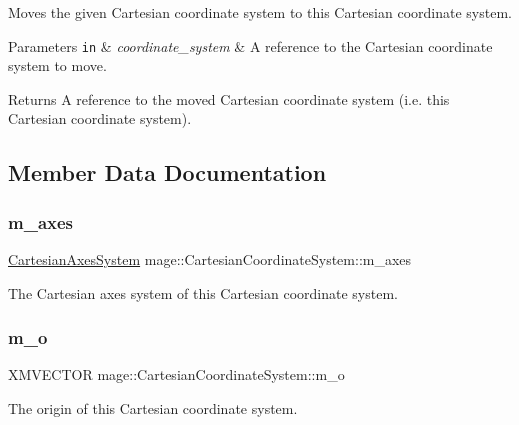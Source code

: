 Moves the given Cartesian coordinate system to this Cartesian coordinate system.


\begin{DoxyParams}[1]{Parameters}
\mbox{\tt in}  & {\em coordinate\+\_\+system} & A reference to the Cartesian coordinate system to move. \\
\hline
\end{DoxyParams}
\begin{DoxyReturn}{Returns}
A reference to the moved Cartesian coordinate system (i.\+e. this Cartesian coordinate system). 
\end{DoxyReturn}


\subsection{Member Data Documentation}
\hypertarget{structmage_1_1_cartesian_coordinate_system_acf7b8cf35026f5fa8fc11a126b96b055}{}\label{structmage_1_1_cartesian_coordinate_system_acf7b8cf35026f5fa8fc11a126b96b055} 
\subsubsection{\texorpdfstring{m\+\_\+axes}{m\_axes}}
{\footnotesize\ttfamily \hyperlink{structmage_1_1_cartesian_axes_system}{Cartesian\+Axes\+System} mage\+::\+Cartesian\+Coordinate\+System\+::m\+\_\+axes\hspace{0.3cm}{\ttfamily [private]}}

The Cartesian axes system of this Cartesian coordinate system. \hypertarget{structmage_1_1_cartesian_coordinate_system_a1ea373bb91be991ee221a2ce1e02be2b}{}\label{structmage_1_1_cartesian_coordinate_system_a1ea373bb91be991ee221a2ce1e02be2b} 
\subsubsection{\texorpdfstring{m\+\_\+o}{m\_o}}
{\footnotesize\ttfamily X\+M\+V\+E\+C\+T\+OR mage\+::\+Cartesian\+Coordinate\+System\+::m\+\_\+o\hspace{0.3cm}{\ttfamily [private]}}

The origin of this Cartesian coordinate system. 